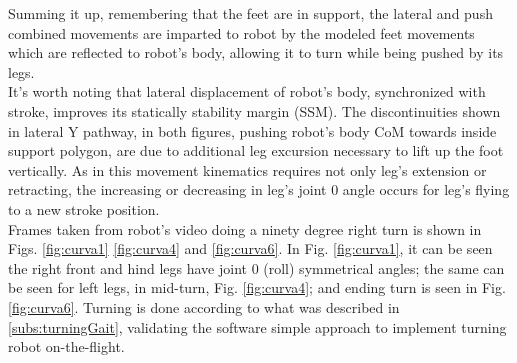 Summing it up, remembering that the feet are in support, the lateral and push combined movements are imparted to robot by the modeled feet movements which are reflected to robot's body, allowing it to turn while being pushed by its legs. \\
It's worth noting that lateral displacement of robot's body, synchronized with stroke, improves its statically stability margin (SSM). The discontinuities shown in lateral Y pathway, in both figures, pushing robot's body CoM towards inside support polygon, are due to additional leg excursion necessary to lift up the foot vertically. As in this movement kinematics requires not only leg's extension or retracting, the increasing or decreasing in leg's joint 0 angle occurs for leg's flying to a new stroke position.\\
Frames taken from robot's video doing a ninety degree right turn is shown in Figs. \ref{fig:curva1} \ref{fig:curva4} and \ref{fig:curva6}. In Fig. \ref{fig:curva1}, it can be seen the right front and hind legs have joint 0 (roll) symmetrical angles; the same can be seen for left legs, in mid-turn, Fig. \ref{fig:curva4}; and ending turn is seen in Fig. \ref{fig:curva6}. Turning is done according to what was described in \ref{subs:turningGait}, validating the software simple approach to implement turning robot on-the-flight.
